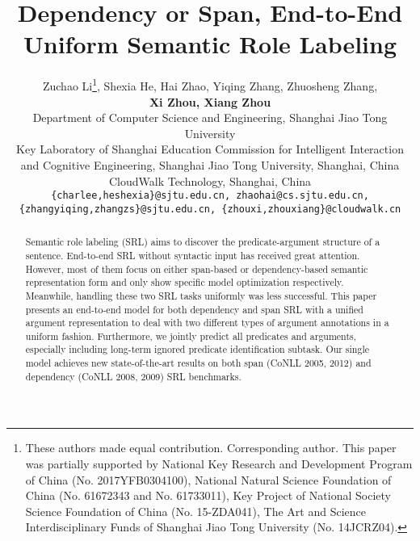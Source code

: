 \documentclass[letterpaper]{article} \usepackage{aaai19}  \usepackage{times}  \usepackage{helvet}  \usepackage{courier}  \usepackage{url}  \usepackage{graphicx}  \frenchspacing  \setlength{\pdfpagewidth}{8.5in}  \setlength{\pdfpageheight}{11in}
\begin{document}
\title{Dependency or Span, End-to-End Uniform Semantic Role Labeling}
\author{Zuchao Li\thanks{ These authors made equal contribution. Corresponding author. This paper was partially supported by National Key Research and Development Program of China (No. 2017YFB0304100), National Natural Science Foundation of China (No. 61672343 and No. 61733011), Key Project of National Society Science Foundation of China (No. 15-ZDA041), The Art and Science Interdisciplinary Funds of Shanghai Jiao Tong University (No. 14JCRZ04).}, Shexia He, Hai Zhao, Yiqing Zhang, Zhuosheng Zhang, 
	\\  \Large\textbf{Xi Zhou, Xiang Zhou}\\
	Department of Computer Science and Engineering, Shanghai Jiao Tong University \\
	Key Laboratory of Shanghai Education Commission for Intelligent Interaction \\ and Cognitive Engineering, Shanghai Jiao Tong University, Shanghai, China\\
	CloudWalk Technology, Shanghai, China\\
	{\tt \{charlee,heshexia\}@sjtu.edu.cn, zhaohai@cs.sjtu.edu.cn,}\\
	{\tt  \{zhangyiqing,zhangzs\}@sjtu.edu.cn, \{zhouxi,zhouxiang\}@cloudwalk.cn}\\
}
\maketitle
\begin{abstract}
Semantic role labeling (SRL) aims to discover the predicate-argument structure of a sentence. End-to-end SRL without syntactic input has received great attention. However, most of them focus on either span-based or dependency-based semantic representation form and only show specific model optimization respectively. Meanwhile, handling these two SRL tasks uniformly was less successful. This paper presents an end-to-end model for both dependency and span SRL with a unified argument representation to deal with two different types of argument annotations in a uniform fashion. Furthermore, we jointly predict all predicates and arguments, especially including long-term ignored predicate identification subtask. Our single model achieves new state-of-the-art results on both span (CoNLL 2005, 2012) and dependency (CoNLL 2008, 2009) SRL benchmarks. 
 
\end{abstract}
\end{document}
